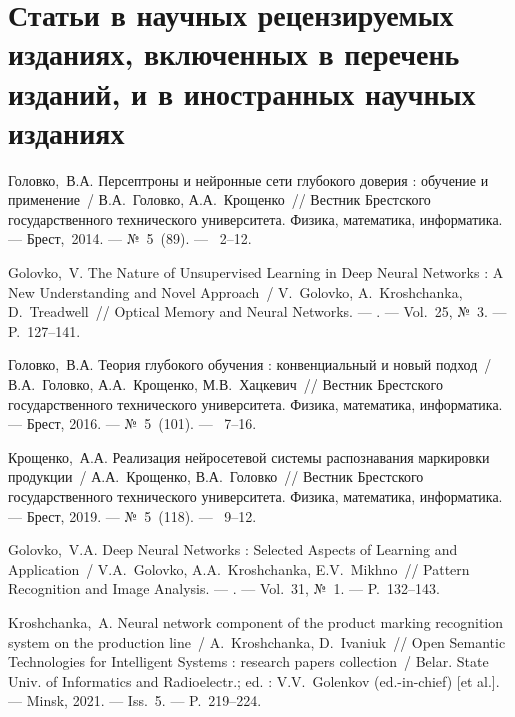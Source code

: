 \ifx\isabstract\undefined 
\section* {Статьи в научных рецензируемых изданиях, включенных в перечень изданий, и в иностранных научных изданиях}
\fi

Головко,~В.А. Персептроны и нейронные сети глубокого доверия : обучение и применение~/ В.А.~Головко, А.А.~Крощенко~//
\newblock Вестник Брестского государственного технического университета. Физика, математика, информатика. ---
\newblock Брест,~2014. ---
\newblock №~5~(89). ---
~2--12.

Golovko,~V. The Nature of Unsupervised Learning in Deep Neural Networks : A New Understanding and Novel Approach~/ V.~Golovko, A.~Kroshchanka, D.~Treadwell~//
\newblock Optical Memory and Neural Networks. ---
. ---
\newblock Vol.~25, №~3. ---
\newblock P.~127--141.

Головко,~В.А. Теория глубокого обучения : конвенциальный и новый подход~/ В.А.~Головко, А.А.~Крощенко, М.В.~Хацкевич~//
\newblock Вестник Брестского государственного технического университета. Физика, математика, информатика. ---
\newblock Брест, 2016. ---
\newblock №~5~(101). ---
~7--16.

Крощенко,~А.А. Реализация нейросетевой системы распознавания маркировки продукции~/ А.А.~Крощенко, В.А.~Головко~//
\newblock Вестник Брестского государственного технического университета. Физика, математика, информатика. ---
\newblock Брест, 2019. ---
\newblock №~5~(118). ---
~9--12.

Golovko,~V.A.  Deep Neural Networks : Selected Aspects of Learning and Application~/ V.A.~Golovko, A.A.~Kroshchanka, E.V.~Mikhno~//
\newblock Pattern Recognition and Image Analysis. ---
. ---
\newblock Vol.~31, №~1. ---
\newblock P.~132--143.

Kroshchanka,~A. Neural network component of the product marking recognition system on the production line~/ A.~Kroshchanka, D.~Ivaniuk~// 
\newblock Open Semantic Technologies for Intelligent Systems : research papers collection~/
\newblock Belar. State Univ. of Informatics and Radioelectr.; ed. : V.V.~Golenkov (ed.-in-chief) [et al.]. ---
\newblock Minsk, 2021. ---
\newblock Iss.~5. ---
\newblock P.~219--224.

